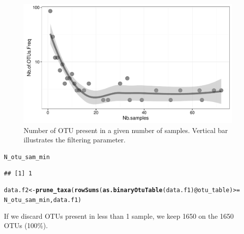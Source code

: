 \documentclass[12pt]{article}\usepackage[]{graphicx}\usepackage[]{color}
\makeatletter
\def\maxwidth{ %
  \ifdim\Gin@nat@width>\linewidth
    \linewidth
  \else
    \Gin@nat@width
  \fi
}
\newcommand{\hlopt}[1]{\textcolor[rgb]{0,0,0}{#1}}%
\newcommand{\hlstd}[1]{\textcolor[rgb]{0.345,0.345,0.345}{#1}}%
\newcommand{\hlkwb}[1]{\textcolor[rgb]{0.69,0.353,0.396}{#1}}%
\newcommand{\hlkwc}[1]{\textcolor[rgb]{0.333,0.667,0.333}{#1}}%
\newcommand{\hlkwd}[1]{\textcolor[rgb]{0.737,0.353,0.396}{\textbf{#1}}}%
\newenvironment{kframe}{%
 \def\at@end@of@kframe{}%
 \ifinner\ifhmode%
  \def\at@end@of@kframe{\end{minipage}}%
  \begin{minipage}{\columnwidth}%
 \fi\fi%
 \def\FrameCommand##1{\hskip\@totalleftmargin \hskip-\fboxsep
 \colorbox{shadecolor}{##1}\hskip-\fboxsep
     \hskip-\linewidth \hskip-\@totalleftmargin \hskip\columnwidth}%
 \MakeFramed {\advance\hsize-\width
   \@totalleftmargin\z@ \linewidth\hsize
   \@setminipage}}%
 {\par\unskip\endMakeFramed%
 \at@end@of@kframe}
\newenvironment{knitrout}{}{} %
\numberwithin{figure}{section}
\makeatother
\begin{document}
\begin{knitrout}
\begin{figure}
{\centering \includegraphics[width=\maxwidth]{figure/nbOtu_sample-1} 

}

\caption[Number of OTU present in a given number of samples]{Number of OTU present in a given number of samples. Vertical bar illustrates the filtering parameter.}\label{fig:nbOtu_sample}
\end{figure}


\end{knitrout}

\begin{knitrout}\small
{}\color{fgcolor}\begin{kframe}
\begin{alltt}
\hlstd{N_otu_sam_min}
\end{alltt}
\begin{verbatim}
## [1] 1
\end{verbatim}
\end{kframe}
\end{knitrout}

\begin{knitrout}\small
{}\color{fgcolor}\begin{kframe}
\begin{alltt}
\hlstd{data.f2} \hlkwb{<-} \hlkwd{prune_taxa}\hlstd{(}\hlkwd{rowSums}\hlstd{(}\hlkwd{as.binaryOtuTable}\hlstd{(data.f1)}\hlopt{@}\hlkwc{otu_table}\hlstd{)} \hlopt{>=}
                        \hlstd{N_otu_sam_min, data.f1)}
\end{alltt}
\end{kframe}
\end{knitrout}

If we discard OTUs present in less than 1 sample, we keep 1650 on the 1650 OTUs (100\%).
\end{document}
